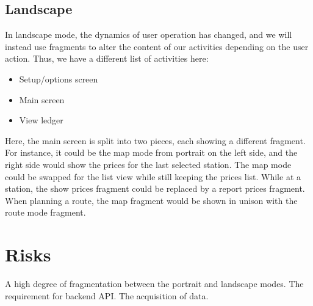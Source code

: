 \subsection{Landscape}
In landscape mode, the dynamics of user operation has changed, and we will instead use fragments to alter the content of our activities depending on the user action. Thus, we have a different list of activities here:
\begin{itemize}
	\item Setup/options screen
	\item Main screen
	\item View ledger
\end{itemize}

Here, the main screen is split into two pieces, each showing a different fragment. For instance, it could be the map mode from portrait on the left side, and the right side would show the prices for the last selected station. The map mode could be swapped for the list view while still keeping the prices list. While at a station, the show prices fragment could be replaced by a report prices fragment. When planning a route, the map fragment would be shown in unison with the route mode fragment.

\section{Risks}
A high degree of fragmentation between the portrait and landscape modes.
The requirement for backend API.
The acquisition of data.